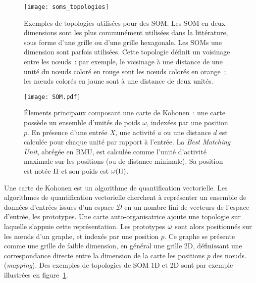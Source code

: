 \documentclass[../main]{subfiles}
\begin{document}
\begin{figure}
    \centering
    \texttt{[image: soms\_topologies]}
    \caption{Exemples de topologies utilisées pour des SOM. Les SOM en deux dimensions sont les plus communément utilisées dans la littérature, sous forme d'une grille ou d'une grille hexagonale. Les SOMs une dimension sont parfois utilisées. Cette topologie définit un voisinage entre les n\oe{}uds~: par exemple, le voisinage à une distance de une unité du n\oe{}uds coloré en rouge sont les n\oe{}uds colorés en orange~; les n\oe{}uds colorés en jaune sont à une distance de deux unités.
    \label{fig:topo}}
    \end{figure}

\begin{figure}
    \centering
    \texttt{[image: SOM.pdf]}
    \caption{\'Elements principaux composant une carte de Kohonen~: une carte possède un ensemble d'unités de poids $\omega$, indexées par une position $p$. En présence d'une entrée $X$, une activité $a$ ou une distance $d$ est calculée pour chaque unité par rapport à l'entrée. La \emph{Best Matching Unit}, abrégée en BMU, est calculée comme l'unité d'activité maximale sur les positions (ou de distance minimale). Sa position est notée $\Pi$ et son poids est $\omega(\Pi)$.\label{fig:SOM}}
    \end{figure}

Une carte de Kohonen est un algorithme de quantification vectorielle. 
Les algorithmes de quantification vectorielle cherchent à représenter un ensemble de données d'entrées issues d'un espace $\mathcal{D}$ en un nombre fini de vecteurs de l'espace d'entrée, les prototypes.
Une carte auto-organisatrice ajoute une topologie sur laquelle s'appuie cette représentation. Les prototypes $\omega$ sont alors positionnés sur les n\oe{}uds d'un graphe, et indexés par une position $p$. 
Ce graphe se présente comme une grille de faible dimension, en général une grille 2D, définissant une correspondance directe entre la dimension de la carte les positions $p$ des n\oe{}uds.
(\emph{mapping}). Des exemples de topologies de SOM 1D et 2D sont par exemple illustrées en figure~\ref{fig:topo}.
\end{document}
